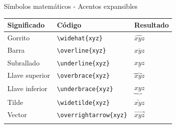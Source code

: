 \documentclass[
  ignorenonframetext,
  aspectratio=169]{beamer}
\begin{document}
\begin{frame}[fragile]{Símbolos matemáticos - Acentos expansibles}
\label{suxedmbolos-matemuxe1ticos---acentos-expansibles}
\begin{longtable}[]{@{}lll@{}}
\toprule\noalign{}
Significado & Código & Resultado \\
\midrule\noalign{}
\endhead
Gorrito & \texttt{\textbackslash{}widehat\{xyz\}} & \(\widehat{xyz}\) \\
Barra & \texttt{\textbackslash{}overline\{xyz\}} & \(\overline{xyz}\) \\
Subrallado & \texttt{\textbackslash{}underline\{xyz\}} &
\(\underline{xyz}\) \\
Llave superior & \texttt{\textbackslash{}overbrace\{xyz\}} &
\(\overbrace{xyz}\) \\
Llave inferior & \texttt{\textbackslash{}underbrace\{xyz\}} &
\(\underbrace{xyz}\) \\
Tilde & \texttt{\textbackslash{}widetilde\{xyz\}} &
\(\widetilde{xyz}\) \\
Vector & \texttt{\textbackslash{}overrightarrow\{xyz\}} &
\(\overrightarrow{xyz}\) \\
\bottomrule\noalign{}
\end{longtable}
\end{frame}
\end{document}
